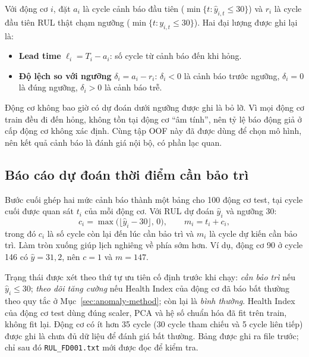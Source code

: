 Với động cơ $i$, đặt $a_i$ là cycle cảnh báo đầu tiên
($\min\{t:\hat y_{i,t}\leq30\}$) và $r_i$ là cycle đầu tiên RUL thật chạm ngưỡng
($\min\{t:y_{i,t}\leq30\}$). Hai đại lượng được ghi lại là:
\begin{itemize}
\item \textbf{Lead time} $\ell_i=T_i-a_i$: số cycle từ cảnh báo đến khi hỏng.
\item \textbf{Độ lệch so với ngưỡng} $\delta_i=a_i-r_i$: $\delta_i<0$ là cảnh
      báo trước ngưỡng, $\delta_i=0$ là đúng ngưỡng, $\delta_i>0$ là cảnh báo trễ.
\end{itemize}
Động cơ không bao giờ có dự đoán dưới ngưỡng được ghi là bỏ lỡ. Vì mọi động cơ
train đều đi đến hỏng, không tồn tại động cơ ``âm tính'', nên tỷ lệ báo động giả
ở cấp động cơ không xác định. Cùng tập OOF này đã được dùng để chọn mô hình, nên kết
quả cảnh báo là đánh giá nội bộ, có phần lạc quan.

\subsection{Báo cáo dự đoán thời điểm cần bảo trì}
\label{sec:maintenance-method}
Bước cuối ghép hai mức cảnh báo thành một bảng cho 100 động cơ test, tại cycle cuối
được quan sát $t_i$ của mỗi động cơ. Với RUL dự đoán $\hat y_i$ và ngưỡng 30:
\begin{equation}
 c_i=\max\bigl(\lfloor\hat y_i-30\rfloor,\,0\bigr),\qquad m_i=t_i+c_i,
 \label{eq:maintenance}
\end{equation}
trong đó $c_i$ là số cycle còn lại đến lúc cần bảo trì và $m_i$ là cycle dự kiến
cần bảo trì. Làm tròn xuống giúp lịch nghiêng về phía sớm hơn. Ví dụ, động cơ 90 ở
cycle 146 có $\hat y=31{,}2$, nên $c=1$ và $m=147$.

Trạng thái được xét theo thứ tự ưu tiên cố định trước khi chạy: \emph{cần bảo trì}
nếu $\hat y_i\leq30$; \emph{theo dõi tăng cường} nếu Health Index của động cơ đã báo
bất thường theo quy tắc ở Mục~\ref{sec:anomaly-method}; còn lại là \emph{bình
thường}. Health Index của động cơ test dùng đúng scaler, PCA và hệ số chuẩn hóa đã
fit trên train, không fit lại. Động cơ có ít hơn 35 cycle (30 cycle tham chiếu và
5 cycle liên tiếp) được ghi là chưa đủ dữ liệu để đánh giá bất thường. Bảng được
ghi ra file trước; chỉ sau đó \texttt{RUL\_FD001.txt} mới được đọc để kiểm tra.
